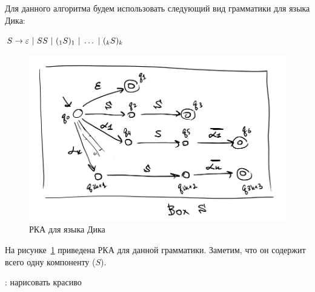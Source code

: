 \begin{note}    
    Для данного алгоритма будем использовать следующий вид грамматики для языка Дика:

    $S \rightarrow \varepsilon~|~SS~|~(_1 S )_1~|~ \dots ~|~(_k S )_k$

    \begin{figure}[H]
        \includegraphics[width=0.75\linewidth]{img/dyck_box}
        \caption{РКА для языка Дика}
        \label{img:dyck_rsm}
    \end{figure}

    На рисунке~\ref{img:dyck_rsm} приведена РКА для данной грамматики. Заметим, что он содержит всего одну компоненту ($S$).

    \TODO: нарисовать красиво

\end{note}


